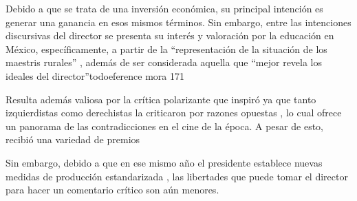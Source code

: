 Debido a que se trata de una inversión económica, su principal intención es generar una ganancia en esos mismos términos. Sin embargo, entre las intenciones discursivas del director se presenta su interés y valoración por la educación en México, específicamente, a partir de la ``representación  de la situación de los maestris rurales'' %
, además de ser considerada aquella que ``mejor revela los ideales del director''todo{eference mora 171}

Resulta además valiosa por la crítica polarizante que inspiró %
ya que tanto izquierdistas como derechistas la criticaron por razones opuestas %
, lo cual ofrece un panorama de las contradicciones en el cine de la época.
A pesar de esto, recibió una variedad de premios %

Sin embargo, debido a que en ese mismo año el presidente establece nuevas medidas de producción estandarizada%
, las libertades que puede tomar el director para hacer un comentario crítico son aún menores.

\pagebreak
